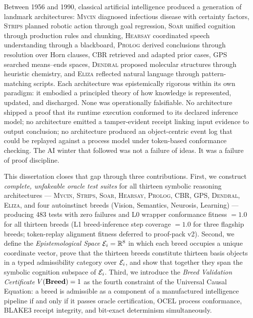 
Between 1956 and 1990, classical artificial intelligence produced a generation of landmark
architectures: \textsc{Mycin} diagnosed infectious disease with certainty factors,
\textsc{Strips} planned robotic action through goal regression, \textsc{Soar} unified
cognition through production rules and chunking, \textsc{Hearsay} coordinated speech
understanding through a blackboard, \textsc{Prolog} derived conclusions through resolution
over Horn clauses, CBR retrieved and adapted prior cases, GPS searched means--ends spaces,
\textsc{Dendral} proposed molecular structures through heuristic chemistry, and \textsc{Eliza}
reflected natural language through pattern-matching scripts. Each architecture was
epistemically rigorous within its own paradigm: it embodied a principled theory of how
knowledge is represented, updated, and discharged. None was operationally falsifiable. No
architecture shipped a proof that its runtime execution conformed to its declared inference
model; no architecture emitted a tamper-evident receipt linking input evidence to output
conclusion; no architecture produced an object-centric event log that could be replayed
against a process model under token-based conformance checking. The AI winter that followed
was not a failure of ideas. It was a failure of proof discipline.

This dissertation closes that gap through three contributions. First, we construct
\emph{complete, unfakeable oracle test suites} for all thirteen symbolic reasoning
architectures — \textsc{Mycin}, \textsc{Strips}, \textsc{Soar}, \textsc{Hearsay},
\textsc{Prolog}, CBR, GPS, \textsc{Dendral}, \textsc{Eliza}, and four
autoinstinct breeds (Vision, Semantics, Neurosis, Learning) — producing 483 tests with
zero failures and L0 wrapper conformance fitness $= 1.0$ for all thirteen breeds (L1
breed-inference step coverage $= 1.0$ for three flagship breeds; token-replay alignment
fitness deferred to proof-pack v2). Second, we define the
\emph{Epistemological Space} $\mathcal{E}_i = \mathbb{R}^8$ in which each breed occupies a unique
coordinate vector, prove that the thirteen breeds constitute thirteen basis objects in a typed admissibility category
over $\mathcal{E}_i$, and show that together they span the symbolic
cognition subspace of $\mathcal{E}_i$. Third, we introduce the \emph{Breed Validation Certificate}
$V(\mathbf{Breed}) = 1$ as the fourth constraint of the Universal Causal Equation: a breed is
admissible as a component of a manufactured intelligence pipeline if and only if it passes
oracle certification, OCEL process conformance, BLAKE3 receipt integrity, and
bit-exact determinism simultaneously.

